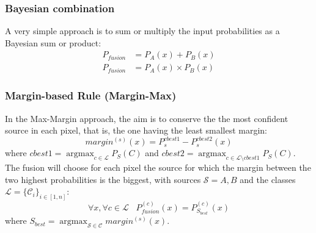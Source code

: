 \documentclass[10pt]{article}
\DeclareMathOperator{\argmax}{argmax}
\begin{document}
\subsubsection{Bayesian combination}\label{sec:bayesian}
A very simple approach is to sum or multiply the input probabilities as a Bayesian sum or product:
\begin{align}
    P_{fusion}&=P_A(x)+P_B(x)\\
    P_{fusion}&=P_A(x)\times P_B(x)
\end{align}
\subsubsection{Margin-based Rule (Margin-Max)}\label{sec:margin}
In the Max-Margin approach, the aim is to conserve the the most confident source in each pixel, that is, the one having the least smallest margin:
\begin{equation}
    margin^{(s)}(x)=P_s^{cbest1}-P_s^{cbest2}(x)
\end{equation}
where $cbest1=\argmax_{c\in\mathcal{L}}P_S(C)$ and $cbest2=\argmax_{c\in\mathcal{L}\setminus cbest1}P_S(C)$. The fusion will choose for each pixel the source for which the margin between the two highest probabilities is the biggest, with sources $\mathcal{S}={A,B}$ and the classes $\mathcal{L}=\{\mathcal{C}_i\}_{i\in[1,n]}$:
\begin{equation}
    \forall x,\forall c\in \mathcal{L}\;\;\; P_{fusion}^{(c)}(x)=P_{S_{best}}^{(c)}(x)
\end{equation}
where $S_{best}=\argmax_{\mathcal{S}\in\mathcal{C}}margin^{(s)}(x)$.
\end{document}
